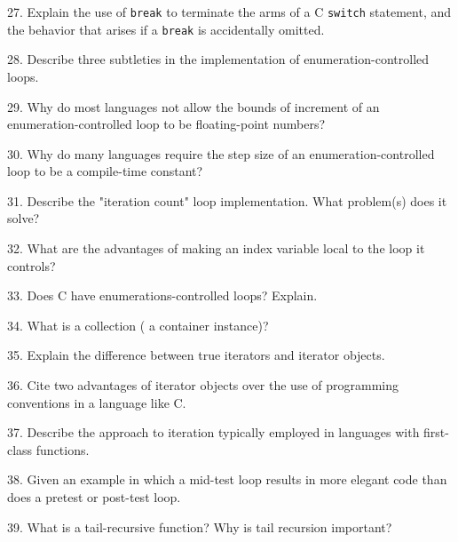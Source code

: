 \filbreak
\vskip 1cm

27. Explain the use of {\tt break} to terminate the arms of a C {\tt switch} statement, and the behavior that arises if a {\tt break} is accidentally omitted.

\filbreak
\vskip 1cm

28. Describe three subtleties in the implementation of enumeration-controlled loops.

\filbreak
\vskip 1cm

29. Why do most languages not allow the bounds of increment of an enumeration-controlled loop to be floating-point numbers?

\filbreak
\vskip 1cm

30. Why do many languages require the step size of an enumeration-controlled loop to be a compile-time constant?

\filbreak
\vskip 1cm

31. Describe the "iteration count" loop implementation. What problem(s) does it solve?

\filbreak
\vskip 1cm

32. What are the advantages of making an index variable local to the loop it controls?

\filbreak
\vskip 1cm

33. Does C have enumerations-controlled loops? Explain.

\filbreak
\vskip 1cm

34. What is a collection ( a container instance)?

\filbreak
\vskip 1cm

35. Explain the difference between true iterators and iterator objects.

\filbreak
\vskip 1cm

36. Cite two advantages of iterator objects over the use of programming conventions in a language like C.

\filbreak
\vskip 1cm

37. Describe the approach to iteration typically employed in languages with first-class functions.

\filbreak
\vskip 1cm

38. Given an example in which a mid-test loop results in more elegant code than does a pretest or post-test loop.

\filbreak
\vskip 1cm

39. What is a tail-recursive function? Why is tail recursion important?

\filbreak
\vskip 1cm

